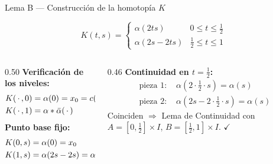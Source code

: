 \begin{frame}{Lema B — Construcción de la homotopía $K$}
  
  \[
    \boxed{K(t,s) =
    \begin{cases}
      \alpha(2ts)       & 0 \le t \le \tfrac{1}{2} \\[4pt]
      \alpha(2s - 2ts)  & \tfrac{1}{2} \le t \le 1
    \end{cases}}
  \]

  \bigskip
  \begin{columns}[T]
    \begin{column}{0.50\textwidth}
      \textbf{Verificación de los niveles:}
      \begin{align*}
        K(\,\cdot\,,0) &= \alpha(0) = x_0 = c(\,\cdot\,) \\
        K(\,\cdot\,,1) &= \alpha * \bar{\alpha}(\,\cdot\,)
      \end{align*}
      \textbf{Punto base fijo:}
      \begin{align*}
        K(0,s) &= \alpha(0) = x_0 \\
        K(1,s) &= \alpha(2s-2s) = \alpha(0) = x_0
      \end{align*}
    \end{column}
    \begin{column}{0.46\textwidth}
      \textbf{Continuidad en $t=\tfrac{1}{2}$:}
      \begin{align*}
        \text{pieza 1: } &\alpha(2\cdot\tfrac{1}{2}\cdot s) = \alpha(s)\\
        \text{pieza 2: } &\alpha(2s - 2\cdot\tfrac{1}{2}\cdot s) = \alpha(s)
      \end{align*}
      Coinciden $\Rightarrow$ Lema de Continuidad con
      $A=[0,\tfrac{1}{2}]\times I$,
      $B=[\tfrac{1}{2},1]\times I$. $\checkmark$
    \end{column}
  \end{columns}
\end{frame}

